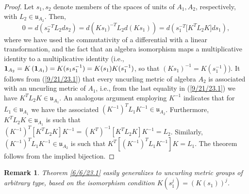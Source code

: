 \documentclass{amsart}
\numberwithin{equation}{section}
\newtheorem{remark}[theorem]{Remark}
\theoremstyle{definition}
\numberwithin{theorem}{section}
\begin{document}
\begin{proof} Let $s_1,s_2$ denote members of the spaces of units of $A_1,A_2$, respectively, with $L_2\in \mathfrak{u}_{A_2}$.  Then, \begin{equation} 0 = d\left(s_2^{-T}L_2 ds_2\right) =  d\left(Ks_1)^{-T}L_2 d(Ks_1)\right) =d\left(s_1^{-T} \big[K^T L_2K\big]ds_1\right), \label{9/21/23.1}  \end{equation} where we have used the commutativity of a differential with a linear transformation, and the fact that an algebra isomorphism maps a multiplicative identity to a multiplicative identity (i.e., ${\bf 1}_{A_2} = K\left(\mathbf{1}_{A_1}\right) = K(s_1s_1^{-1}) = K(s_1)K(s_1^{-1})$, so that $(Ks_1)^{-1} = K(s_1^{-1})$).  It follows from (\ref{9/21/23.1}) that every uncurling metric of algebra $A_2$ is associated with an uncurling metric of $A_1$, i.e., from the last equality in (\ref{9/21/23.1}) we have  $K^TL_2K\in\mathfrak{u}_{A_1}$.  An analogous argument employing $K^{-1}$ indicates that for $L_1\in\mathfrak{u}_{A_1}$ we have the associated $(K^{-1})^T L_1 K^{-1} \in \mathfrak{u}_{A_2}$.  Furthermore, $K^T L_2K\in\mathfrak{u}_{A_1}$ is such that $(K^{-1})^T [K^T L_2 K]K^{-1} = (K^T)^{-1} [K^T L_2 K]K^{-1} = L_2$.  Similarly, $(K^{-1})^T L_1K^{-1}\in\mathfrak{u}_{A_2}$ is such that $K^T[(K^{-1})^T L_1K^{-1}] K = L_1$.  The theorem follows from the implied bijection. 
\end{proof}

\begin{remark} \label{9/18/23.1} {\rm Theorem \ref{6/6/23.1} easily generalizes to uncurling metric groups of arbitrary type, based on the isomorphism condition $K(s_1^j) = (K(s_1))^j$.   } \end{remark}
\end{document}

